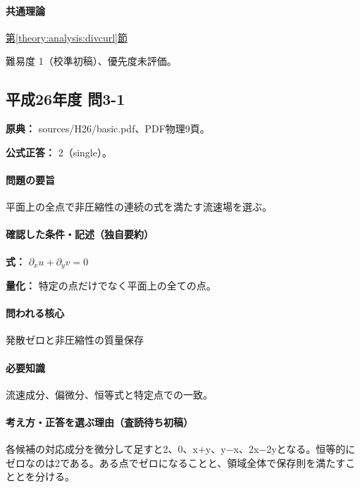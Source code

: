 \paragraph{共通理論} \hyperref[theory:analysis:divcurl]{第\ref*{theory:analysis:divcurl}節}

\par 難易度 1（校準初稿）、優先度未評価。

\subsection{平成26年度 問3-1}
\label{q:h26-reg-basic-3-1}

\noindent\textbf{原典：} sources/H26/basic.pdf、PDF物理9頁。

\textbf{公式正答：} 2（single）。

\paragraph{問題の要旨} 平面上の全点で非圧縮性の連続の式を満たす流速場を選ぶ。

\paragraph{確認した条件・記述（独自要約）}\mbox{}\par

\noindent\textbf{式：} \(\partial_xu+\partial_yv=0\)\par

\noindent\textbf{量化：} 特定の点だけでなく平面上の全ての点。\par

\paragraph{問われる核心} 発散ゼロと非圧縮性の質量保存

\paragraph{必要知識} 流速成分、偏微分、恒等式と特定点での一致。

\paragraph{考え方・正答を選ぶ理由（査読待ち初稿）} 各候補の対応成分を微分して足すと2、0、x+y、y−x、2x−2yとなる。恒等的にゼロなのは2である。ある点でゼロになることと、領域全体で保存則を満たすこととを分ける。

